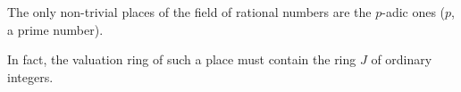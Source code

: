 The only non-trivial places of the field of rational numbers are the $p$-adic ones ($p$, a prime number).

In fact, the valuation ring of such a place must contain the ring $J$ of ordinary integers.